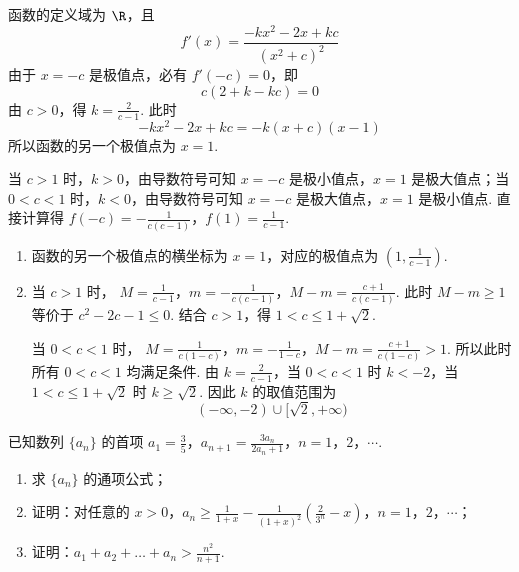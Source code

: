 \begin{solution}
函数的定义域为 \(\R\)，且
\[
f'(x)=\frac{-kx^{2}-2x+kc}{(x^{2}+c)^{2}}
\]
由于 \(x=-c\) 是极值点，必有 \(f'(-c)=0\)，即
\[
c\left(2+k-kc\right)=0
\]
由 \(c>0\)，得 \(k=\frac{2}{c-1}\). 此时
\[
-kx^{2}-2x+kc=-k(x+c)(x-1)
\]
所以函数的另一个极值点为 \(x=1\).

当 \(c>1\) 时，\(k>0\)，由导数符号可知 \(x=-c\) 是极小值点，\(x=1\) 是极大值点；当 \(0<c<1\) 时，\(k<0\)，由导数符号可知 \(x=-c\) 是极大值点，\(x=1\) 是极小值点. 直接计算得
\(f(-c)=-\frac{1}{c(c-1)}\)，\(f(1)=\frac{1}{c-1}\).

\begin{enumerate}
\item 函数的另一个极值点的横坐标为 \(x=1\)，对应的极值点为 \(\left(1,\frac{1}{c-1}\right)\).

\item 当 \(c>1\) 时，
\(M=\frac{1}{c-1}\)，\(m=-\frac{1}{c(c-1)}\)，\(M-m=\frac{c+1}{c(c-1)}\).
此时 \(M-m\geqslant1\) 等价于 \(c^{2}-2c-1\leqslant0\). 结合 \(c>1\)，得 \(1<c\leqslant1+\sqrt{2}\).

当 \(0<c<1\) 时，
\(M=\frac{1}{c(1-c)}\)，\(m=-\frac{1}{1-c}\)，\(M-m=\frac{c+1}{c(1-c)}>1\).
所以此时所有 \(0<c<1\) 均满足条件. 由 \(k=\frac{2}{c-1}\)，当 \(0<c<1\) 时 \(k<-2\)，当 \(1<c\leqslant1+\sqrt{2}\) 时 \(k\geqslant\sqrt{2}\). 因此 \(k\) 的取值范围为
\[
(-\infty,-2)\cup[\sqrt{2},+\infty)
\]
\end{enumerate}
\end{solution}

\begin{problem}
已知数列 \(\{a_{n}\}\) 的首项 \(a_1 = \frac{3}{5}\)，\(a_{n+1} = \frac{3a_n}{2a_n + 1}\)，\(n = 1\)，\(2\)，\(\cdots\).
\begin{enumerate}
\item 求 \(\{a_{n}\}\) 的通项公式；
\item 证明：对任意的 \(x > 0\)，\(a_{n} \geqslant \frac{1}{1 + x} - \frac{1}{(1 + x)^{2}} \left( \frac{2}{3^{n}} - x \right)\)，\(n = 1\)，\(2\)，\(\cdots\)；
\item 证明：\(a_{1} + a_{2} + \dots + a_{n} > \frac{n^{2}}{n + 1}\).
\end{enumerate}
\end{problem}

